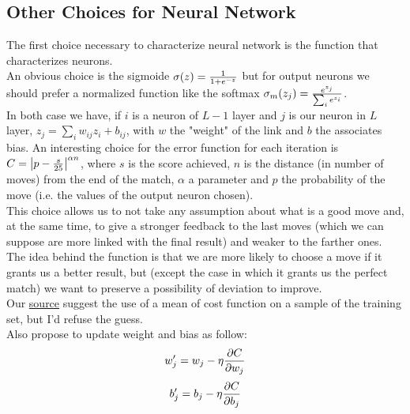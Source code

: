 \documentclass[]{article}
\begin{document}
\subsection{Other Choices for Neural Network}
The first choice necessary to characterize neural network is the function that characterizes neurons. \\
An obvious choice is the sigmoide $\sigma(z)={1 \over {1 + e^{-z}}}$ but for output neurons we should prefer a normalized function like the softmax $\sigma_m (z_j)={{e^{z_j}} \over {\sum_{i} e^{z_i}}}$. \\
In both case we have, if $i$ is a neuron of $L-1$ layer and $j$ is our neuron in $L$ layer, $z_j=\sum_i {w_{ij}}{z_i}+{b_{ij}}$, with $w$ the "weight" of the link and $b$ the associates bias.
An interesting choice for the error function for each iteration is $C={\left| p - {{s} \over 25}\right| }^{\alpha n}$, where $s$ is the score achieved, $n$ is the distance (in number of moves) from the end of the match, $\alpha$ a parameter and $p$ the probability of the move (i.e. the values of the output neuron chosen). \\
This choice allows us to not take any assumption about what is a good move and, at the same time, to give a stronger feedback to the last moves (which we can suppose are more linked with the final result) and weaker to the farther ones. \\
The idea behind the function is that we are more likely to choose a move if it grants us a better result, but (except the case in which it grants us the perfect match) we want to preserve a possibility of deviation to improve. \\
Our \href{http://neuralnetworksanddeeplearning.com}{source} suggest the use of a mean of cost function on a sample of the training set, but I'd refuse the guess. \\
Also propose to update weight and bias as follow:
\[ w'_j = w_j - \eta {{\partial C} \over {\partial w_j}} \]
\[b'_j = b_j - \eta {{\partial C} \over {\partial b_j}}\]
\end{document}
